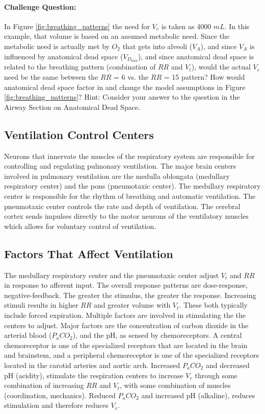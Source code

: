 \paragraph{Challenge Question:} In Figure \ref{fig:breathing_patterns} the need for $V_e$ is taken as 4000 $mL$. In this example, that volume is based on an assumed metabolic need. Since the metabolic need is actually met by $O_2$ that gets into alveoli ($V_A$), and since $V_A$ is influenced by anatomical dead space ($V_D_{ana}$), and since anatomical dead space is related to the breathing pattern (combination of $RR$ and $V_t$), would the actual $V_e$ need be the same between the $RR$ = 6 vs. the $RR$ = 15 pattern? How would anatomical dead space factor in and change the model assumptions in Figure \ref{fig:breathing_patterns}? Hint: Consider your answer to the question in the Airway Section on Anatomical Dead Space.

\subsection{Ventilation Control Centers}

Neurons that innervate the muscles of the respiratory system are responsible for controlling and regulating pulmonary ventilation. The major brain centers involved in pulmonary ventilation are the medulla oblongata (medullary respiratory center) and the pons (pneumotaxic center). The medullary respiratory center is responsible for the rhythm of breathing and automatic ventilation. The pneumotaxic center controls the rate and depth of ventilation. The cerebral cortex sends impulses directly to the motor neurons of the ventilatory muscles which allows for voluntary control of ventilation.

\subsection{Factors That Affect Ventilation} 

The medullary respiratory center and the pneumotaxic center adjust $V_t$ and $RR$ in response to afferent input.  The overall response patterns are dose-response, negative-feedback. The greater the stimulus, the greater the response. Increasing stimuli results in higher $RR$ and greater volume with $V_t$. These both typically include forced expiration.  Multiple factors are involved in stimulating the the centers to adjust. Major factors are the concentration of carbon dioxide in the arterial blood ($P_aCO_2$), and the pH, as sensed by chemoreceptors. A central chemoreceptor is one of the specialized receptors that are located in the brain and brainstem, and a peripheral chemoreceptor is one of the specialized receptors located in the carotid arteries and aortic arch. Increased $P_aCO_2$ and decreased pH (acidity), stimulate the respiration centers to increase $V_e$ through some combination of increasing $RR$ and $V_t$, with some combination of muscles (coordination, mechanics). Reduced $P_aCO_2$ and increased pH (alkaline), reduces stimulation and therefore reduces $V_e$.

